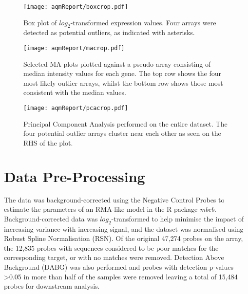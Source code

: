 \documentclass{article}\usepackage{knitr}
\begin{document}
\begin{figure}[h]
  \centering
  \texttt{[image: aqmReport/boxcrop.pdf]}
  \caption{Box plot of $log_2$-transformed expression values. Four arrays were detected as potential outliers, as indicated with asterisks. \label{fig:aqmBoxplot}}
\end{figure}

\begin{figure}[h]
  \centering
  \texttt{[image: aqmReport/macrop.pdf]}
  \caption{Selected MA-plots plotted against a pseudo-array consisting of median intensity values for each gene. The top row shows the four most likely outlier arrays, whilst the bottom row shows those most consistent with the median values.\label{fig:aqmMAplot}}
\end{figure}

\begin{figure}[h]
  \centering
  \texttt{[image: aqmReport/pcacrop.pdf]}
  \caption{Principal Component Analysis performed on the entire dataset. The four potential outlier arrays cluster near each other as seen on the RHS of the plot.\label{fig:aqmPCAplot}}
\end{figure}

\clearpage
\section{Data Pre-Processing}














The data was background-corrected using the Negative Control Probes to estimate the parameters of an RMA-like model in the R package \textit{mbcb}.
Background-corrected data was $log_2$-transformed to help minimise the impact of increasing variance with increasing signal, and the dataset was normalised using Robust Spline Normalisation (RSN).
Of the original 47,274 probes on the array, the 12,835 probes with sequences considered to be poor matches for the corresponding target, or with no matches were removed.
Detection Above Background (DABG) was also performed and probes with detection p-values \textgreater 0.05 in more than half of the samples were removed leaving a total of 15,484 probes for downstream analysis.
\end{document}
